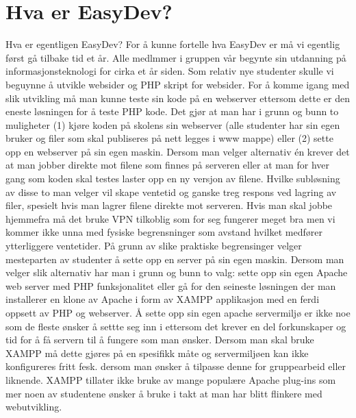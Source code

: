 \chapter{Hva er EasyDev?} \label{sec:hvaereasydev}

\lettrine[lines=2]{H}{}va er egentligen EasyDev? For å kunne fortelle hva EasyDev er må vi egentlig først gå tilbake tid et år. Alle medlmmer i gruppen vår begynte sin utdanning på informasjonsteknologi for cirka et år siden. Som relativ nye studenter skulle vi beguynne å utvikle websider og PHP skript for websider. For å komme igang med slik utvikling må man kunne teste sin kode på en webserver ettersom dette er den eneste løsningen for å teste PHP kode. Det gjør at man har i grunn og bunn to muligheter (1) kjøre koden på skolens sin webserver (alle studenter har sin egen bruker og filer som skal publiseres på nett legges i www mappe) eller (2) sette opp en webserver på sin egen maskin. Dersom man velger alternativ én krever det at man jobber direkte mot filene som finnes på serveren eller at man for hver gang som koden skal testes laster opp en ny versjon av filene. Hvilke subløsning av disse to man velger vil skape ventetid og ganske treg respons ved lagring av filer, spesielt hvis man lagrer filene direkte mot serveren. Hvis man skal jobbe hjemmefra må det bruke VPN tilkoblig som for seg fungerer meget bra men vi kommer ikke unna med fysiske begrensninger som avstand hvilket medfører ytterliggere ventetider. 
På grunn av slike praktiske begrensinger velger mesteparten av studenter å sette opp en server på sin egen maskin. Dersom man velger slik alternativ har man i grunn og bunn to valg: sette opp sin egen Apache web server med PHP funksjonalitet eller gå for den seineste løsningen der man installerer en klone av Apache i form av XAMPP applikasjon med en ferdi oppsett av PHP og webserver. Å sette opp sin egen apache servermiljø er ikke noe som de fleste ønsker å settte seg inn i ettersom det krever en del forkunskaper og tid for å få servern til å fungere som man ønsker. Dersom man skal bruke XAMPP må dette gjøres på en spesifikk måte og servermiljøen kan ikke konfigureres fritt fesk. dersom man ønsker å tilpasse denne for gruppearbeid eller liknende. XAMPP tillater ikke bruke av mange populære Apache plug-ins som mer noen av studentene ønsker å bruke i takt at man har blitt flinkere med webutvikling.

